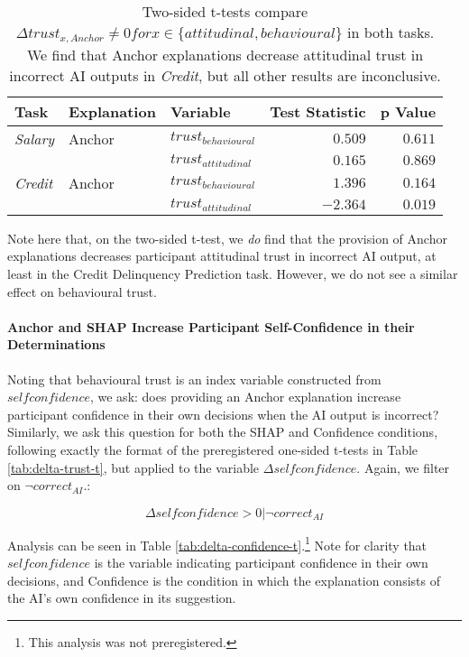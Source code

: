 \begin{table}[htb]
    \centering
    \caption{Two-sided t-tests compare $\Delta trust_{x,Anchor} \neq 0 for x \in \{attitudinal, behavioural\}$ in both tasks. We find that Anchor explanations decrease attitudinal trust in incorrect AI outputs in \emph{Credit}, but all other results are inconclusive.}
    \label{tab:delta-trust-t-2}
    \begin{tabular}{lllrr}
        \toprule
        Task & Explanation & Variable & Test Statistic & p Value \\ 
        \midrule
        \emph{Salary} & Anchor & $trust_{behavioural}$ & $0.509$ & $0.611$ \\
        & & $trust_{attitudinal}$ & $0.165$ & $0.869$ \\
        \midrule
        \emph{Credit} & Anchor & $trust_{behavioural}$ & $1.396$ & $0.164$ \\
        & & $trust_{attitudinal}$ & $\mathbf{-2.364}$ & $\mathbf{0.019}$ \\
        \bottomrule
    \end{tabular}
\end{table}

Note here that, on the two-sided t-test, we \textit{do} find that the provision of Anchor explanations decreases participant attitudinal trust in incorrect AI output, at least in the Credit Delinquency Prediction task. However, we do not see a similar effect on behavioural trust. 

\paragraph{Anchor and SHAP Increase Participant Self-Confidence in their Determinations}
Noting that behavioural trust is an index variable constructed from $selfconfidence$, we ask: does providing an Anchor explanation increase participant confidence in their own decisions when the AI output is incorrect? Similarly, we ask this question for both the SHAP and Confidence conditions, following exactly the format of the preregistered one-sided t-tests in Table \ref{tab:delta-trust-t}, but applied to the variable $\Delta selfconfidence$. Again, we filter on $\neg correct_{AI}$.:

\begin{equation}
    \Delta selfconfidence > 0 | \neg correct_{AI}
\end{equation}

Analysis can be seen in Table \ref{tab:delta-confidence-t}.\footnote{This analysis was not preregistered.} Note for clarity that $selfconfidence$ is the variable indicating participant confidence in their own decisions, and Confidence is the condition in which the explanation consists of the AI's own confidence in its suggestion.

